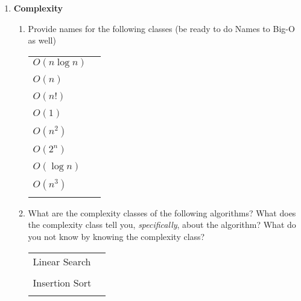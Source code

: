 \documentclass[nobib]{tufte-handout}
\begin{document}
\begin{enumerate}
  \item \textbf{Complexity}
    \begin{enumerate}
      \item Provide names for the following classes (be ready to do  Names to Big-O as well)
      \vspace{.2in}
      \begin{center}
        \begin{tabular}{ll}
          \( O(n \log n) \) & \underline{\hspace{3in}} \\ \\
          \( O(n) \) & \underline{\hspace{3in}} \\ \\
          \( O(n!) \) & \underline{\hspace{3in}} \\ \\
          \( O(1) \) & \underline{\hspace{3in}} \\ \\
          \( O(n^2) \) & \underline{\hspace{3in}} \\ \\
          \( O(2^n) \) & \underline{\hspace{3in}} \\ \\
          \( O(\log n) \) & \underline{\hspace{3in}} \\ \\
          \( O( n^3 ) \) & \underline{\hspace{3in}} \\ \\
        \end{tabular}
      \end{center}

      \item What are the complexity classes of the following algorithms? What does the complexity class tell you, \textit{specifically}, about the algorithm? What do you not know by knowing the complexity class?
      \vspace{.2in}
      \begin{center}
        \begin{tabular}{ll}
          Linear Search & \underline{\hspace{3in}} \\ \\
          Insertion Sort & \underline{\hspace{3in}} \\ \\
        \end{tabular}
      \end{center}
      \newpage \thispagestyle{empty}


\end{enumerate}
\end{enumerate}
\end{document}
